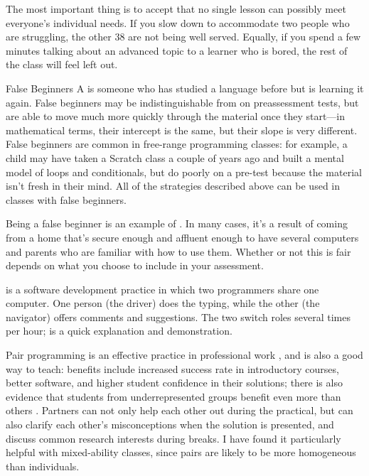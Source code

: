 The most important thing is to accept that no single lesson can possibly
meet everyone's individual needs. If you slow down to accommodate two
people who are struggling, the other 38 are not being well served.
Equally, if you spend a few minutes talking about an advanced topic to a
learner who is bored, the rest of the class will feel left out.

\begin{aside}{False Beginners}
  A  is someone who has
  studied a language before but is learning it again. False beginners
  may be indistinguishable from
   on preassessment
  tests, but are able to move much more quickly through the material
  once they start---in mathematical terms, their intercept is the same,
  but their slope is very different. False beginners are common in
  free-range programming classes: for example, a child may have taken a
  Scratch class a couple of years ago and built a mental model of loops
  and conditionals, but do poorly on a pre-test because the material
  isn't fresh in their mind. All of the strategies described above can
  be used in classes with false beginners.

  Being a false beginner is an example of
  \cite{Marg2010}. In many cases, it's a result of coming from a home
  that's secure enough and affluent enough to have several computers and
  parents who are familiar with how to use them. Whether or not this is
  fair depends on what you choose to include in your assessment.
\end{aside}


 is a software development
practice in which two programmers share one computer. One person (the
driver) does the typing, while the other (the navigator) offers
comments and suggestions. The two switch roles several times per hour;
 is a quick explanation and
demonstration.

Pair programming is an effective practice in professional work
\cite{Hann2009}, and is also a good way to teach: benefits include
increased success rate in introductory courses, better software, and
higher student confidence in their solutions; there is also evidence
that students from underrepresented groups benefit even more than
others
\cite{McDo2006,Hank2011,Port2013,Cele2018}.
Partners can not only help each other out during the practical, but
can also clarify each other's misconceptions when the solution is
presented, and discuss common research interests during breaks. I have
found it particularly helpful with mixed-ability classes, since pairs
are likely to be more homogeneous than individuals.

